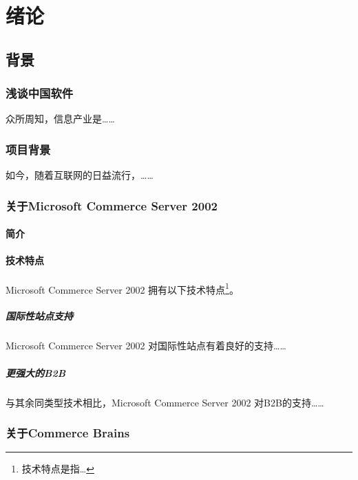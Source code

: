 \documentclass[printMode=true, declarePage=false]{ecnuthesis}
\begin{document}
\mainmatter

\chapter{绪论}

\section{背景}

\subsection{浅谈中国软件}

众所周知，信息产业是……

\subsection{项目背景}

如今，随着互联网的日益流行，……

\subsection{关于Microsoft Commerce Server 2002}

\subsubsection{简介}

\subsubsection{技术特点}

Microsoft Commerce Server 2002 拥有以下技术特点\footnote{技术特点是指…}。

\paragraph{国际性站点支持}

Microsoft Commerce Server 2002 对国际性站点有着良好的支持……

\paragraph{更强大的B2B}

与其余同类型技术相比，Microsoft Commerce Server 2002 对B2B的支持……


\subsection{关于Commerce Brains}
\end{document}
